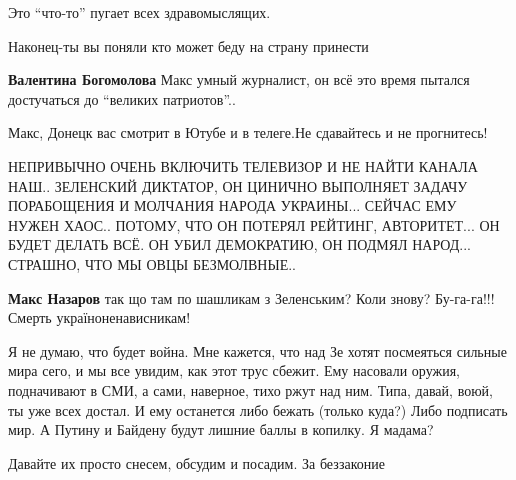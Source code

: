 \begin{itemize}
Это \enquote{что-то} пугает всех здравомыслящих.

Наконец-ты вы поняли кто может беду на страну принести

\begin{itemize} %
\textbf{Валентина Богомолова} Макс умный журналист, он всё это время пытался достучаться до \enquote{великих патриотов}..

Макс, Донецк вас смотрит в Ютубе и в телеге.Не сдавайтесь и не прогнитесь!
\end{itemize} %


НЕПРИВЫЧНО ОЧЕНЬ ВКЛЮЧИТЬ ТЕЛЕВИЗОР И НЕ НАЙТИ КАНАЛА НАШ.. ЗЕЛЕНСКИЙ
ДИКТАТОР, ОН ЦИНИЧНО ВЫПОЛНЯЕТ ЗАДАЧУ ПОРАБОЩЕНИЯ И МОЛЧАНИЯ НАРОДА
УКРАИНЫ... СЕЙЧАС ЕМУ НУЖЕН ХАОС.. ПОТОМУ, ЧТО ОН ПОТЕРЯЛ РЕЙТИНГ, АВТОРИТЕТ... ОН
БУДЕТ ДЕЛАТЬ ВСЁ. ОН УБИЛ ДЕМОКРАТИЮ, ОН ПОДМЯЛ НАРОД... СТРАШНО, ЧТО МЫ ОВЦЫ
БЕЗМОЛВНЫЕ..

\textbf{Макс Назаров} так що там по шашликам з Зеленським? Коли знову? Бу-га-га!!! Смерть україноненависникам!


Я не думаю, что будет война. Мне кажется, что над Зе хотят посмеяться сильные
мира сего, и мы все увидим, как этот трус сбежит. Ему насовали оружия,
подначивают в СМИ, а сами, наверное, тихо ржут над ним. Типа, давай, воюй, ты
уже всех достал. И ему останется либо бежать (только куда?) Либо подписать мир.
А Путину и Байдену будут лишние баллы в копилку. Я мадама?

Давайте их просто снесем, обсудим и посадим. За беззаконие

\end{itemize} %
